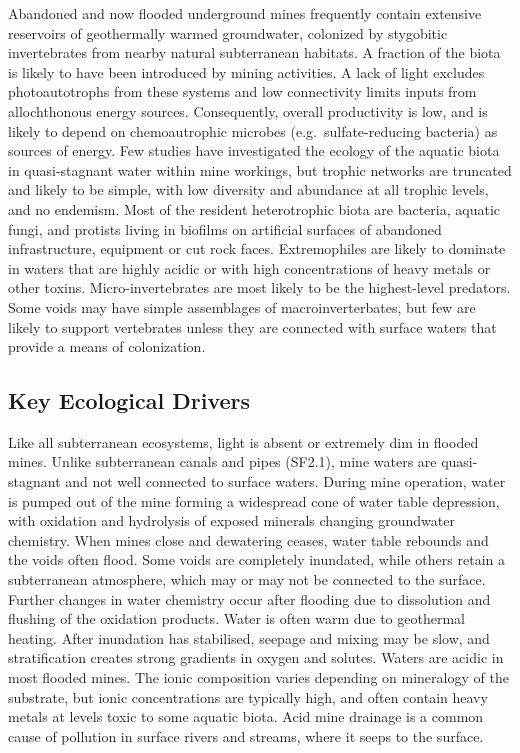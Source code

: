 \documentclass[
  letterpaper,
  DIV=11,
  numbers=noendperiod]{scrartcl}
\begin{document}
Abandoned and now flooded underground mines frequently contain extensive
reservoirs of geothermally warmed groundwater, colonized by stygobitic
invertebrates from nearby natural subterranean habitats. A fraction of
the biota is likely to have been introduced by mining activities. A lack
of light excludes photoautotrophs from these systems and low
connectivity limits inputs from allochthonous energy sources.
Consequently, overall productivity is low, and is likely to depend on
chemoautrophic microbes (e.g.~sulfate-reducing bacteria) as sources of
energy. Few studies have investigated the ecology of the aquatic biota
in quasi-stagnant water within mine workings, but trophic networks are
truncated and likely to be simple, with low diversity and abundance at
all trophic levels, and no endemism. Most of the resident heterotrophic
biota are bacteria, aquatic fungi, and protists living in biofilms on
artificial surfaces of abandoned infrastructure, equipment or cut rock
faces. Extremophiles are likely to dominate in waters that are highly
acidic or with high concentrations of heavy metals or other toxins.
Micro-invertebrates are most likely to be the highest-level predators.
Some voids may have simple assemblages of macroinverterbates, but few
are likely to support vertebrates unless they are connected with surface
waters that provide a means of colonization.

\subsection{Key Ecological Drivers}\label{key-ecological-drivers-65}

Like all subterranean ecosystems, light is absent or extremely dim in
flooded mines. Unlike subterranean canals and pipes (SF2.1), mine waters
are quasi-stagnant and not well connected to surface waters. During mine
operation, water is pumped out of the mine forming a widespread cone of
water table depression, with oxidation and hydrolysis of exposed
minerals changing groundwater chemistry. When mines close and dewatering
ceases, water table rebounds and the voids often flood. Some voids are
completely inundated, while others retain a subterranean atmosphere,
which may or may not be connected to the surface. Further changes in
water chemistry occur after flooding due to dissolution and flushing of
the oxidation products. Water is often warm due to geothermal heating.
After inundation has stabilised, seepage and mixing may be slow, and
stratification creates strong gradients in oxygen and solutes. Waters
are acidic in most flooded mines. The ionic composition varies depending
on mineralogy of the substrate, but ionic concentrations are typically
high, and often contain heavy metals at levels toxic to some aquatic
biota. Acid mine drainage is a common cause of pollution in surface
rivers and streams, where it seeps to the surface.
\end{document}

